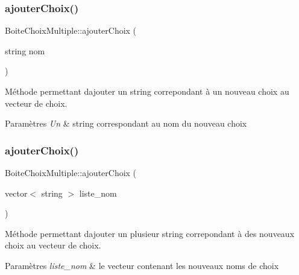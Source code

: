 \subsubsection{\texorpdfstring{ajouter\+Choix()}{ajouterChoix()}\hspace{0.1cm}{\footnotesize\ttfamily [1/2]}}
{\footnotesize\ttfamily Boite\+Choix\+Multiple\+::ajouter\+Choix (\begin{DoxyParamCaption}\item[{string}]{nom }\end{DoxyParamCaption})}



Méthode permettant d\textquotesingle{}ajouter un string correpondant à un nouveau choix au vecteur de choix. 


\begin{DoxyParams}{Paramètres}
{\em Un} & string correspondant au nom du nouveau choix \\
\hline
\end{DoxyParams}
\mbox{\label{class_boite_choix_multiple_a52c59e771b17233ba4e1816907a68284}} 
\subsubsection{\texorpdfstring{ajouter\+Choix()}{ajouterChoix()}\hspace{0.1cm}{\footnotesize\ttfamily [2/2]}}
{\footnotesize\ttfamily Boite\+Choix\+Multiple\+::ajouter\+Choix (\begin{DoxyParamCaption}\item[{vector$<$ string $>$}]{liste\+\_\+nom }\end{DoxyParamCaption})}



Méthode permettant d\textquotesingle{}ajouter un plusieur string correpondant à des nouveaux choix au vecteur de choix. 


\begin{DoxyParams}{Paramètres}
{\em liste\+\_\+nom} & le vecteur contenant les nouveaux noms de choix \\
\hline
\end{DoxyParams}
\mbox{\label{class_boite_choix_multiple_a3766802fe49f850dbda7a6bdbcb2d5d7}} 
